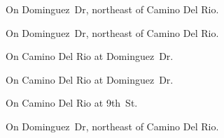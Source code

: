 
\begin{LocationList}

On Dominguez~Dr, northeast of   Camino Del Rio.

\Location{\GasStation \Gas \Rest}
On Dominguez~Dr, northeast of   Camino Del Rio.

On   Camino Del Rio at Dominguez~Dr.

On   Camino Del Rio at Dominguez~Dr.

On  Camino Del Rio at 9th~St.

\Location{\TruckService \Service \Rest}
On Dominguez~Dr, northeast of   Camino Del Rio.

\end{LocationList}
